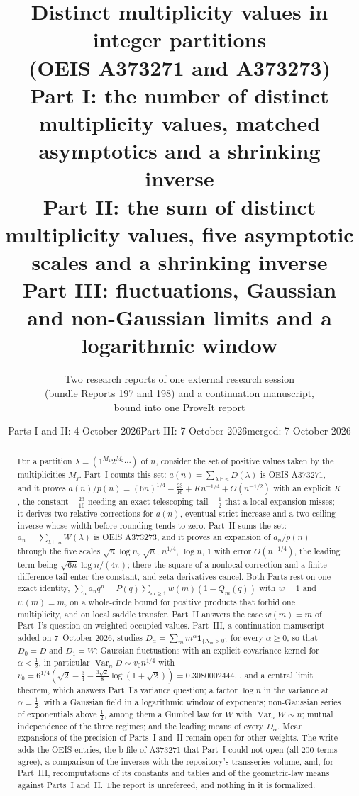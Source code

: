\documentclass[11pt,letterpaper]{article}
\title{\LARGE\bfseries Distinct multiplicity values in integer partitions\\[4pt]\large (OEIS A373271 and A373273)\\[8pt]
\normalsize Part I: the number of distinct multiplicity values, matched asymptotics and a shrinking inverse\\[2pt]
Part II: the sum of distinct multiplicity values, five asymptotic scales and a shrinking inverse\\[2pt]
Part III: fluctuations, Gaussian and non-Gaussian limits and a logarithmic window}
\author{Two research reports of one external research session\\(bundle Reports 197 and 198) and a continuation manuscript,\\bound into one ProveIt report}
\date{Parts I and II: 4 October 2026\quad Part III: 7 October 2026\quad merged: 7 October 2026}
\numberwithin{equation}{section}
\theoremstyle{definition}\newtheorem{definition}[theorem]{Definition}
\theoremstyle{remark}\newtheorem{remark}[theorem]{Remark}
\DeclareMathOperator{\Var}{Var}
\begin{document}
\hypersetup{pageanchor=false}
\maketitle
\begin{abstract}
For a partition $\lambda=(1^{M_1}2^{M_2}\cdots)$ of $n$, consider the set of positive values taken by the multiplicities $M_j$. Part~I counts this set: $a(n)=\sum_{\lambda\vdash n}D(\lambda)$ is OEIS A373271, and it proves $a(n)/p(n)=(6n)^{1/4}-\tfrac{23}{16}+Kn^{-1/4}+O(n^{-1/2})$ with an explicit $K$, the constant $-\tfrac{23}{16}$ needing an exact telescoping tail $-\tfrac12$ that a local expansion misses; it derives two relative corrections for $a(n)$, eventual strict increase and a two-ceiling inverse whose width before rounding tends to zero. Part~II sums the set: $a_n=\sum_{\lambda\vdash n}W(\lambda)$ is OEIS A373273, and it proves an expansion of $a_n/p(n)$ through the five scales $\sqrt n\log n$, $\sqrt n$, $n^{1/4}$, $\log n$, $1$ with error $O(n^{-1/4})$, the leading term being $\sqrt{6n}\log n/(4\pi)$; there the square of a nonlocal correction and a finite-difference tail enter the constant, and zeta derivatives cancel. Both Parts rest on one exact identity, $\sum_na_nq^n=P(q)\sum_{m\ge1}w(m)(1-Q_m(q))$ with $w=1$ and $w(m)=m$, on a whole-circle bound for positive products that forbid one multiplicity, and on local saddle transfer. Part~II answers the case $w(m)=m$ of Part~I's question on weighted occupied values. Part~III, a continuation manuscript added on 7~October 2026, studies $D_\alpha=\sum_mm^\alpha\mathbf 1_{\{N_m>0\}}$ for every $\alpha\ge0$, so that $D_0=D$ and $D_1=W$: Gaussian fluctuations with an explicit covariance kernel for $\alpha<\tfrac12$, in particular $\Var_nD\sim v_0n^{1/4}$ with $v_0=6^{1/4}(\sqrt2-\tfrac34-\tfrac{3\sqrt2}8\log(1+\sqrt2))=0.3080002444\ldots$ and a central limit theorem, which answers Part~I's variance question; a factor $\log n$ in the variance at $\alpha=\tfrac12$, with a Gaussian field in a logarithmic window of exponents; non-Gaussian series of exponentials above $\tfrac12$, among them a Gumbel law for $W$ with $\Var_nW\sim n$; mutual independence of the three regimes; and the leading means of every $D_\alpha$. Mean expansions of the precision of Parts~I and~II remain open for other weights. The write adds the OEIS entries, the b-file of A373271 that Part~I could not open (all 200 terms agree), a comparison of the inverses with the repository's transseries volume, and, for Part~III, recomputations of its constants and tables and of the geometric-law means against Parts~I and~II. The report is unrefereed, and nothing in it is formalized.
\end{abstract}
\hypersetup{pageanchor=true}
{\small\setcounter{tocdepth}{1}\setlength{\parskip}{0pt}\tableofcontents}
\newpage
\end{document}
